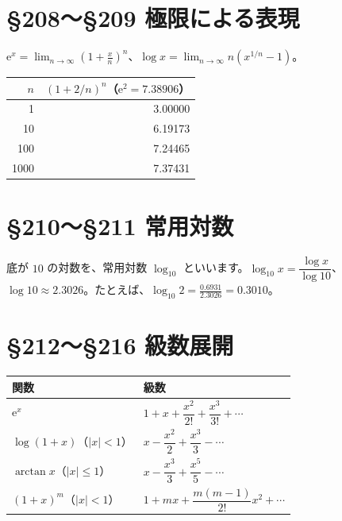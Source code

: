 \documentclass[a4paper,11pt,openany]{ltjsbook}
\newcommand{\ee}{\mathrm{e}}
\begin{document}
\section{§208〜§209 極限による表現}

$\ee^x=\displaystyle\lim_{n\to\infty}\left(1+\frac xn\right)^n$、$\log x=\displaystyle\lim_{n\to\infty}n\left(x^{1/n}-1\right)$。

\begin{center}
\begin{tabular}{rr}
\toprule
$n$ & $(1+2/n)^n$（$\ee^2=7.38906$）\\
\midrule
1 & 3.00000\\
10 & 6.19173\\
100 & 7.24465\\
1000 & 7.37431\\
\bottomrule
\end{tabular}
\end{center}

\section{§210〜§211 常用対数}

底が $10$ の対数を、常用対数 $\log_{10}$ といいます。$\log_{10}x=\dfrac{\log x}{\log10}$、$\log10\approx2.3026$。たとえば、$\log_{10}2=\frac{0.6931}{2.3026}=0.3010$。

\section{§212〜§216 級数展開}

\begin{center}
\renewcommand{\arraystretch}{1.5}
\begin{tabular}{ll}
\toprule
関数 & 級数\\
\midrule
$\ee^x$ & $1+x+\dfrac{x^2}{2!}+\dfrac{x^3}{3!}+\cdots$\\
$\log(1+x)$（$|x|<1$） & $x-\dfrac{x^2}{2}+\dfrac{x^3}{3}-\cdots$\\
$\arctan x$（$|x|\le1$） & $x-\dfrac{x^3}{3}+\dfrac{x^5}{5}-\cdots$\\
$(1+x)^m$（$|x|<1$） & $1+mx+\dfrac{m(m-1)}{2!}x^2+\cdots$\\
\bottomrule
\end{tabular}
\end{center}
\end{document}
